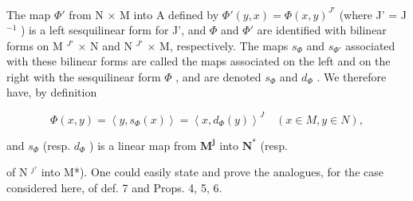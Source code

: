 The map \(\Phi'\) from N × M into A defined by \(\Phi'(y, x) = \Phi(x, y)^{J'}\) (where J' = J \(^{-1}\) ) is a left sesquilinear form for J', and \(\Phi\) and \(\Phi'\) are identified with bilinear forms on M \(^{J'}\) × N and N \(^{J'}\) × M, respectively. The maps \(s_{\Phi}\) and \(s_{\Phi'}\) associated with these bilinear forms are called the maps associated on the left and on the right with the sesquilinear form \(\Phi\) , and are denoted \(s_{\Phi}\) and \(d_{\Phi}\) . We therefore have, by definition

\[
\Phi (x, y) = \left\langle y, s _ {\Phi} (x) \right\rangle = \left\langle x, d _ {\Phi} (y) \right\rangle^ {J} \quad (x \in M, y \in N),\tag{26}
\]

and \(s_{\Phi}\) (resp. \(d_{\Phi}\) ) is a linear map from \(\mathbf{M}^{\mathbf{j}}\) into \(\mathbf{N}^{*}\) (resp.

of N \(^{j'}\) into M*). One could easily state and prove the analogues, for the case considered here, of def. 7 and Props. 4, 5, 6.

